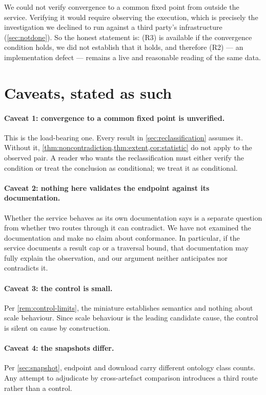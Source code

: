 \documentclass[11pt,a4paper]{article}
\theoremstyle{plain}
\theoremstyle{definition}
\theoremstyle{remark}
\begin{document}
We could not verify convergence to a common fixed point from outside the
service. Verifying it would require observing the execution, which is precisely
the investigation we declined to run against a third party's infrastructure
(\cref{sec:notdone}). So the honest statement is: (R3) is available if the
convergence condition holds, we did not establish that it holds, and therefore
(R2) --- an implementation defect --- remains a live and reasonable reading of
the same data.

\section{Caveats, stated as such}
\label{sec:caveats}

\paragraph{Caveat 1: convergence to a common fixed point is unverified.}
This is the load-bearing one. Every result in
\cref{sec:reclassification} assumes it. Without it,
\cref{thm:noncontradiction,thm:extent,cor:statistic} do not apply to the
observed pair. A reader who wants the reclassification must either verify the
condition or treat the conclusion as conditional; we treat it as conditional.

\paragraph{Caveat 2: nothing here validates the endpoint against its documentation.}
Whether the service behaves as its own documentation says is a separate question
from whether two routes through it can contradict. We have not examined the
documentation and make no claim about conformance. In particular, if the service
documents a result cap or a traversal bound, that documentation may fully
explain the observation, and our argument neither anticipates nor contradicts
it.

\paragraph{Caveat 3: the control is small.}
Per \cref{rem:control-limits}, the miniature establishes semantics and nothing
about scale behaviour. Since scale behaviour is the leading candidate cause, the
control is silent on cause by construction.

\paragraph{Caveat 4: the snapshots differ.}
Per \cref{sec:snapshot}, endpoint and download carry different ontology class
counts. Any attempt to adjudicate by cross-artefact comparison introduces a
third route rather than a control.
\end{document}

